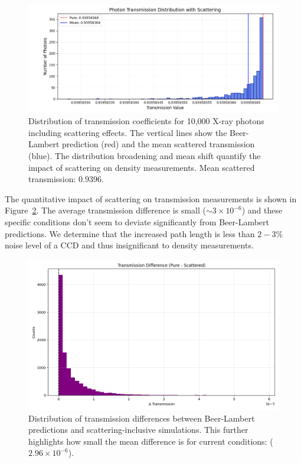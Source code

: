 \documentclass[twocolumn]{aastex701}
\begin{document}
\begin{figure}[htbp]
  \centering
  \includegraphics[width=\linewidth]{scattering_transmission_comparison.png}
  \caption{Distribution of transmission coefficients for 10,000 X-ray photons including scattering effects. The vertical lines show the Beer-Lambert prediction (red) and the mean scattered transmission (blue). The distribution broadening and mean shift quantify the impact of scattering on density measurements. Mean scattered transmission: $0.9396$.}
  \label{fig:intensity-with-scattering}
\end{figure}

The quantitative impact of scattering on transmission measurements is shown in Figure~\ref{fig:intensity-difference}. The average transmission difference is small ($\sim 3 \times 10^{-6}$) and these specific conditions don't seem to deviate significantly from Beer-Lambert predictions. We determine that the increased path length is less than $2-3 \%$ noise level of a CCD and thus insignificant to density measurements.

\begin{figure}[htbp]
  \centering
  \includegraphics[width=\linewidth]{transmission_diff.png}
  \caption{Distribution of transmission differences between Beer-Lambert predictions and scattering-inclusive simulations. This further highlights how small the mean difference is for current conditions: ($2.96 \times 10^{-6}$).}
  \label{fig:intensity-difference}
\end{figure}
\end{document}

